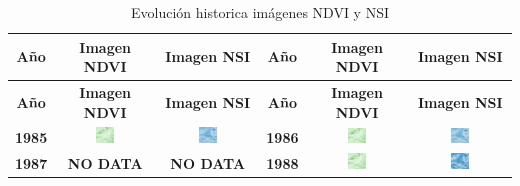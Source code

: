 \renewcommand{\arraystretch}{1.5}
\begin{longtable}{|c|c|c|c|c|c|}
    \caption{Evolución historica imágenes NDVI y NSI} \\
    \hline
    \textbf{Año} & \textbf{Imagen NDVI} & \textbf{Imagen NSI} & \textbf{Año} & \textbf{Imagen NDVI} & \textbf{Imagen NSI} \\
    \endfirsthead
    \hline
    \textbf{Año} & \textbf{Imagen NDVI} & \textbf{Imagen NSI} & \textbf{Año} & \textbf{Imagen NDVI} & \textbf{Imagen NSI} \\
    \endhead
    \hline
    \textbf{1985} & \includegraphics[width=0.2\textwidth]{img_sat/NDVI_1985.png} & \includegraphics[width=0.2\textwidth]{img_sat/NSI_1985.png} &
    \textbf{1986} & \includegraphics[width=0.2\textwidth]{img_sat/NDVI_1986.png} & \includegraphics[width=0.2\textwidth]{img_sat/NSI_1986.png} \\
    \hline
    

    \textbf{1987} & \textbf{NO DATA} & \textbf{NO DATA}  &
    \textbf{1988} & \includegraphics[width=0.2\textwidth]{img_sat/NDVI_1988.png} & \includegraphics[width=0.2\textwidth]{img_sat/NSI_1988.png} \\
    \hline
    


\end{longtable}
